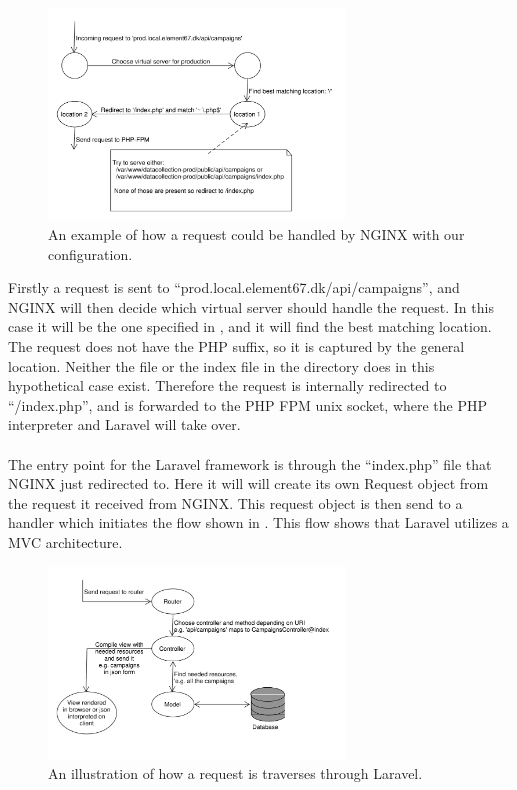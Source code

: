 \begin{figure}[!htbp]
    \centering
    \includegraphics[width=0.7\textwidth]{graphic/architecture/NGINX_workflow.pdf}
    \caption{An example of how a request could be handled by NGINX with our configuration.}
    \label{fig:NGINX_workflow}
\end{figure}
\FloatBarrier

Firstly a request is sent to ``prod.local.element67.dk/api/campaigns'', and NGINX will then decide which virtual server should handle the request. In this case it will be the one specified in , and it will find the best matching location. The request does not have the PHP suffix, so it is captured by the general location. Neither the file or the index file in the directory does in this hypothetical case exist. Therefore the request is internally redirected to ``/index.php'', and is forwarded to the PHP FPM unix socket, where the PHP interpreter and Laravel will take over. 
\\\\
The entry point for the Laravel framework is through the ``index.php'' file that NGINX just redirected to. Here it will will create its own Request object from the request it received from NGINX. This request object is then send to a handler which initiates the flow shown in . This flow shows that Laravel utilizes a MVC architecture.

\begin{figure}[!htbp]
    \centering
    \includegraphics[width=0.7\textwidth]{graphic/architecture/laravel_flow.pdf}
    \caption{An illustration of how a request is traverses through Laravel.}
    \label{fig:laravel_flow}
\end{figure}

